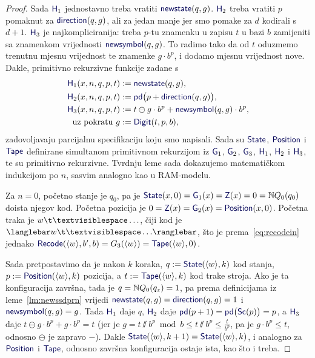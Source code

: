 \begin{proof}
Sada $\f H_1$ jednostavno treba vratiti $\f{newstate}(q,g)$. $\f H_2$ treba vratiti $p$ pomaknut za $\f{direction}(q,g)$, ali za jedan manje jer smo pomake za $d$ kodirali s $d+1$. $\f H_3$ je najkompliciranija: treba $p$-tu znamenku u zapisu $t$ u bazi $b$ zamijeniti sa znamenkom vrijednosti $\f{newsymbol}(q,g)$. To radimo tako da od $t$ oduzmemo trenutnu mjesnu vrijednost te znamenke $g\cdot b^p$, i dodamo mjesnu vrijednost nove. Dakle, primitivno rekurzivne funkcije zadane s
\begin{align}
    \f H_1(x,n,q,p,t)&:=\f{newstate}(q,g)\text,\\
    \f H_2(x,n,q,p,t)&:=\f{pd}\bigl(p+\f{direction}(q,g)\bigr)\text,\\
    \f H_3(x,n,q,p,t)&:=t\ominus g\cdot b^p+\f{newsymbol}(q,g)\cdot b^p\text,\\
    \text{uz pokratu }g&:=\f{Digit}(t,p,b)\text,
\end{align}
zadovoljavaju parcijalnu specifikaciju koju smo napisali. Sada su $\f{State}$, $\f{Position}$ i $\f{Tape}$ definirane simultanom primitivnom rekurzijom iz $\f G_1$, $\f G_2$, $\f G_3$, $\f H_1$, $\f H_2$ i $\f H_3$, te su primitivno rekurzivne. Tvrdnju leme sada dokazujemo matematičkom indukcijom po $n$, sasvim analogno kao u RAM-modelu.

Za $n=0$, početno stanje je $q_0$, pa je $\f{State}(x,0)=\f G_1(x)=\f Z(x)=0=\N Q_0(q_0)$ doista njegov kod. Početna pozicija je $0=\f Z(x)=\f G_2(x)=\f{Position}(x,0)$. Početna traka je $w\bl\ldots$, čiji kod je $\knk{w\bl\ldots}$, što je prema~\ref{eq:recodein} jednako $\f{Recode}(\kr w,b',b)=G_3(\kr w)=\f{Tape}(\kr w,0)$.

Sada pretpostavimo da je nakon $k$ koraka, $q:=\f{State}(\kr w,k)$ kod stanja, $p:=\f{Position}(\kr w,k)$ pozicija, a $t:=\f{Tape}(\kr w,k)$ kod trake stroja. Ako je ta konfiguracija završna, tada je $q={\mathbb N} Q_0(q_z)=1$, pa prema definicijama iz leme~\ref{lm:newssdprn} vrijedi $\f{newstate}(q,g)=\f{direction}(q,g)=1$ i $\f{newsymbol}(q,g)=g$. Tada $\f H_1$ daje $q$, $\f H_2$ daje $\f{pd}(p+1)=\f{pd}\bigl(\f{Sc}(p)\bigr)=p$, a $\f H_3$ daje $t\ominus g\cdot b^p+g\cdot b^p=t$ (jer je $g=t\sslash b^p\bmod b\le t\sslash b^p\le\frac{t}{b^p}$, pa je $g\cdot b^p\le t$, odnosno $\ominus$ je zapravo $-$). Dakle $\f{State}(\kr w,k+1)=\f{State}(\kr w,k)$, i analogno za $\f{Position}$ i $\f{Tape}$, odnosno završna konfiguracija ostaje ista, kao što i treba.


\end{proof}
